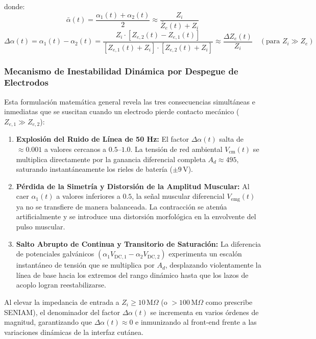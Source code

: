 \documentclass[11pt,a4paper]{article}
\begin{document}
donde:
\begin{equation}
\bar{\alpha}(t) = \frac{\alpha_1(t) + \alpha_2(t)}{2} \approx \frac{Z_i}{\bar{Z}_e(t) + Z_i}
\end{equation}
\begin{equation}
\Delta\alpha(t) = \alpha_1(t) - \alpha_2(t) = \frac{Z_i \cdot \left[ Z_{e, 2}(t) - Z_{e, 1}(t) \right]}{\left[ Z_{e, 1}(t) + Z_i \right] \cdot \left[ Z_{e, 2}(t) + Z_i \right]} \approx \frac{\Delta Z_e(t)}{Z_i} \quad (\text{para } Z_i \gg Z_e)
\end{equation}

\subsubsection{Mecanismo de Inestabilidad Dinámica por Despegue de Electrodos}
Esta formulación matemática general revela las tres consecuencias simultáneas e inmediatas que se suscitan cuando un electrodo pierde contacto mecánico ($Z_{e, 1} \gg Z_{e, 2}$):
\begin{enumerate}
    \item \textbf{Explosión del Ruido de Línea de 50 Hz:} El factor $\Delta\alpha(t)$ salta de $\approx 0.001$ a valores cercanos a $0.5\text{--}1.0$. La tensión de red ambiental $V_{\text{cm}}(t)$ se multiplica directamente por la ganancia diferencial completa $A_d \approx 495$, saturando instantáneamente los rieles de batería ($\pm 9\,\text{V}$).
    \item \textbf{Pérdida de la Simetría y Distorsión de la Amplitud Muscular:} Al caer $\alpha_1(t)$ a valores inferiores a $0.5$, la señal muscular diferencial $V_{\text{emg}}(t)$ ya no se transfiere de manera balanceada. La contracción se atenúa artificialmente y se introduce una distorsión morfológica en la envolvente del pulso muscular.
    \item \textbf{Salto Abrupto de Continua y Transitorio de Saturación:} La diferencia de potenciales galvánicos $(\alpha_1 V_{\text{DC}, 1} - \alpha_2 V_{\text{DC}, 2})$ experimenta un escalón instantáneo de tensión que se multiplica por $A_d$, desplazando violentamente la línea de base hacia los extremos del rango dinámico hasta que los lazos de acoplo logran reestabilizarse.
\end{enumerate}
Al elevar la impedancia de entrada a $Z_i \ge 10\,\text{M}\Omega$ (o $> 100\,\text{M}\Omega$ como prescribe SENIAM), el denominador del factor $\Delta\alpha(t)$ se incrementa en varios órdenes de magnitud, garantizando que $\Delta\alpha(t) \approx 0$ e inmunizando al front-end frente a las variaciones dinámicas de la interfaz cutánea.
\end{document}
